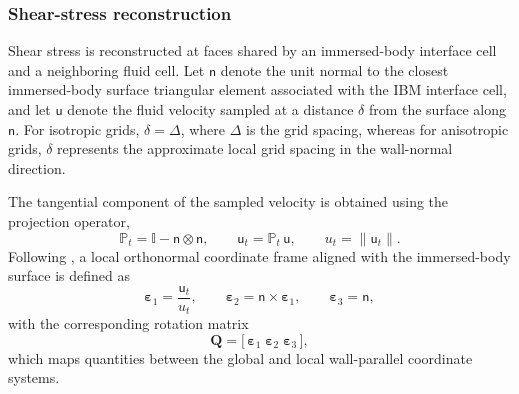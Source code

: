 \documentclass[%
superscriptaddress,
 amsmath,amssymb,
pra,
showkeys,
]{revtex4-2}
\begin{document}
\subsubsection{Shear-stress reconstruction}

Shear stress is reconstructed at faces shared by an immersed-body interface cell and a neighboring fluid cell. Let $\boldsymbol{\mathsf{n}}$ denote the unit normal to the closest immersed-body surface triangular element associated with the IBM interface cell, and let $\boldsymbol{\mathsf{u}}$ denote the fluid velocity sampled at a distance $\delta$ from the surface along $\boldsymbol{\mathsf{n}}$. For isotropic grids, $\delta=\Delta$, where $\Delta$ is the grid spacing, whereas for anisotropic grids, $\delta$ represents the approximate local grid spacing in the wall-normal direction.

The tangential component of the sampled velocity is obtained using the projection operator,
\[
\mathbb{P}_t = \mathbb{I} - \boldsymbol{\mathsf{n}} \otimes \boldsymbol{\mathsf{n}},
\qquad
\boldsymbol{\mathsf{u}}_t = \mathbb{P}_t\,\boldsymbol{\mathsf{u}},
\qquad
u_t = \lVert \boldsymbol{\mathsf{u}}_t \rVert .
\]
Following \citet{chester2007modeling}, a local orthonormal coordinate frame aligned with the immersed-body surface is defined as
\[
\boldsymbol{\varepsilon}_1 = \frac{\boldsymbol{\mathsf{u}}_t}{u_t},
\qquad
\boldsymbol{\varepsilon}_2 = \boldsymbol{\mathsf{n}} \times \boldsymbol{\varepsilon}_1,
\qquad
\boldsymbol{\varepsilon}_3 = \boldsymbol{\mathsf{n}},
\]
with the corresponding rotation matrix
\[
\mathbf{Q}
=
\big[\,\boldsymbol{\varepsilon}_1\;\boldsymbol{\varepsilon}_2\;\boldsymbol{\varepsilon}_3\,\big],
\]
which maps quantities between the global and local wall-parallel coordinate systems.
\end{document}
